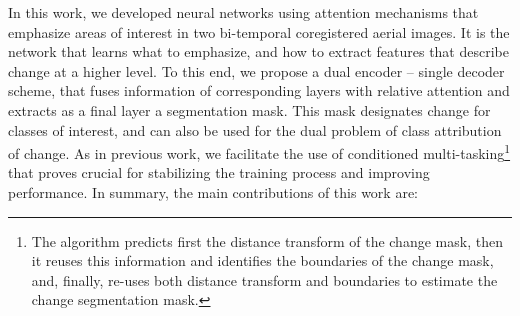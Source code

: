 \documentclass[times, 5p]{elsarticle}
\begin{document}
In this work, we developed neural networks using attention mechanisms that emphasize areas of interest in two bi-temporal coregistered aerial images.
It is the network that learns what to emphasize, and how to extract features that describe change at a higher level. To this end, we propose a dual encoder -- single decoder scheme, that fuses information of corresponding layers with relative attention and extracts as a final layer  a segmentation mask. This mask designates change for classes of interest, and can also  be used for the dual problem of class attribution of change. As in previous work, we facilitate the use of conditioned multi-tasking\footnote{The algorithm predicts first the distance transform of the change mask, then it reuses this information and identifies the boundaries of the change mask, and, finally, re-uses both distance transform and boundaries to estimate the change segmentation mask.} \citep{DIAKOGIANNIS202094} that proves crucial for stabilizing the training process and improving performance. 
In summary, the main  contributions of this work are:
\end{document}
